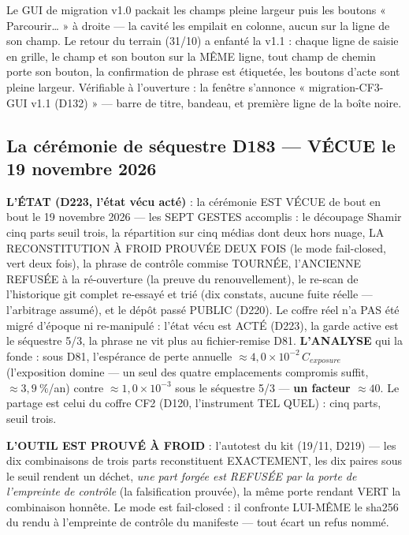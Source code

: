 \begin{terrain}
Le GUI de migration v1.0 packait les champs pleine largeur puis les boutons
« Parcourir\ldots{} » à droite — la cavité les empilait en colonne, aucun sur la
ligne de son champ. Le retour du terrain (31/10) a enfanté la v1.1 : chaque ligne
de saisie en grille, le champ et son bouton sur la MÊME ligne, tout champ de chemin
porte son bouton, la confirmation de phrase est étiquetée, les boutons d'acte sont
pleine largeur. Vérifiable à l'ouverture : la fenêtre s'annonce
« migration-CF3-GUI v1.1 (D132) » — barre de titre, bandeau, et première ligne de la
boîte noire.
\end{terrain}

\subsection{La cérémonie de séquestre D183 — VÉCUE le 19 novembre 2026}\label{sec:cerd183}

\textbf{L'ÉTAT (D223, l'état vécu acté)} : la cérémonie EST VÉCUE de bout
en bout le 19 novembre 2026 — les SEPT GESTES accomplis : le découpage
Shamir cinq parts seuil trois, la répartition sur cinq médias dont deux
hors nuage, LA RECONSTITUTION À FROID PROUVÉE DEUX FOIS (le mode
 fail-closed, vert deux fois), la phrase de contrôle
commise TOURNÉE, l'ANCIENNE REFUSÉE à la ré-ouverture (la preuve du
renouvellement), le re-scan de l'historique git complet re-essayé et trié
(dix constats, aucune fuite réelle — l'arbitrage assumé), et le dépôt
passé PUBLIC (D220). Le coffre réel n'a PAS été migré d'époque ni
re-manipulé : l'état vécu est ACTÉ (D223), la garde active est le
séquestre 5/3, la phrase ne vit plus au fichier-remise D81.
\textbf{L'ANALYSE} qui la fonde : sous D81, l'espérance de perte annuelle
$\approx 4{,}0 \times 10^{-2}\,C_{exposure}$ (l'exposition domine — un seul
des quatre emplacements compromis suffit, $\approx 3{,}9~\%$/an) contre
$\approx 1{,}0 \times 10^{-3}$ sous le séquestre 5/3 — \textbf{un facteur
$\approx 40$}. Le partage est celui du coffre CF2 (D120, l'instrument
 TEL QUEL) : cinq parts, seuil trois.

\textbf{L'OUTIL EST PROUVÉ À FROID} : l'autotest du kit (19/11, D219) — les
dix combinaisons de trois parts reconstituent EXACTEMENT, les dix paires
sous le seuil rendent un déchet, \emph{une part forgée est REFUSÉE par la
porte de l'empreinte de contrôle} (la falsification prouvée), la même porte
rendant VERT la combinaison honnête. Le mode  est
fail-closed : il confronte LUI-MÊME le sha256 du rendu à l'empreinte de
contrôle du manifeste — tout écart un refus nommé.

